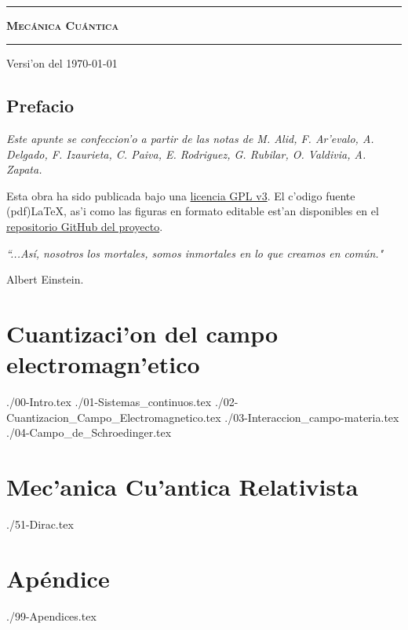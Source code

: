 \documentclass[letterpaper,11pt]{report}
\begin{document}
\sffamily


\thispagestyle{empty}
\begin{center}

\

\vspace{6.5cm}

\rule{15cm}{0.1cm}

\vspace{1.5cm}

{\huge \textsc{\textbf{Mec\'anica Cu\'antica}}}

\vspace{1.5cm}

\rule{15cm}{0.1cm}

\vspace{1.5cm}

Versi'on del \today

\end{center}
\newpage
\setcounter{page}{1}

\pagestyle{plain}
\chapter*{Prefacio}
\bigskip
\bigskip
\bigskip
\bigskip
\bigskip
\bigskip



\emph{Este apunte se confeccion'o a partir de las notas de M.
Alid, F. Ar'evalo,  A. Delgado, F. Izaurieta, C. Paiva, E. Rodriguez, G.
Rubilar, O. Valdivia, A. Zapata.}


\bigskip
\bigskip
\bigskip
\bigskip
\bigskip
\bigskip


Esta obra ha sido publicada bajo una \href{https://github.com/gfrubi/RG/blob/master/LICENSE}{licencia GPL v3}. El c'odigo fuente (pdf)\LaTeX, as'i como las figuras en formato editable est'an disponibles en el \href{https://github.com/gfrubi/cuantica}{repositorio GitHub del proyecto}.


\bigskip
\bigskip
\bigskip

\bigskip
\bigskip
\bigskip



\emph{\textquotedblleft ...As\'i, nosotros los mortales, somos
inmortales en lo que creamos en com\'un."}

\begin{flushright}
Albert Einstein.
\end{flushright}
\newpage

\tableofcontents

\part{Cuantizaci'on del campo electromagn'etico}
\setcounter{page}{1}
 {./00-Intro.tex}
 {./01-Sistemas_continuos.tex}
 {./02-Cuantizacion_Campo_Electromagnetico.tex}
 {./03-Interaccion_campo-materia.tex}
 {./04-Campo_de_Schroedinger.tex}

\part{Mec'anica Cu'antica Relativista}
%
 {./51-Dirac.tex}
\part{Ap\'endice}
 {./99-Apendices.tex}
\end{document}
